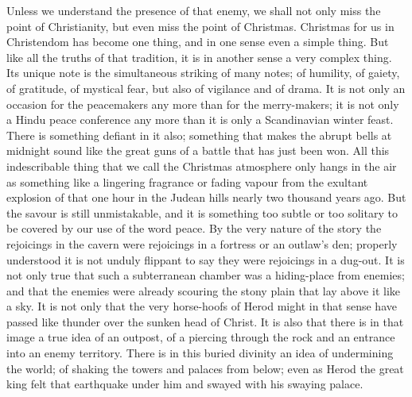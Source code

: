Unless we understand the presence of that enemy, we shall not only miss the point of Christianity, but even miss the point of Christmas. Christmas for us in Christendom has become one thing, and in one sense even a simple thing. But like all the truths of that tradition, it is in another sense a very complex thing. Its unique note is the simultaneous striking of many notes; of humility, of gaiety, of gratitude, of mystical fear, but also of vigilance and of drama. It is not only an occasion for the peacemakers any more than for the merry-makers; it is not only a Hindu peace conference any more than it is only a Scandinavian winter feast. There is something defiant in it also; something that makes the abrupt bells at midnight sound like the great guns of a battle that has just been won. All this indescribable thing that we call the Christmas atmosphere only hangs in the air as something like a lingering fragrance or fading vapour from the exultant explosion of that one hour in the Judean hills nearly two thousand years ago. But the savour is still unmistakable, and it is something too subtle or too solitary to be covered by our use of the word peace. By the very nature of the story the rejoicings in the cavern were rejoicings in a fortress or an outlaw's den; properly understood it is not unduly flippant to say they were rejoicings in a dug-out. It is not only true that such a subterranean chamber was a hiding-place from enemies; and that the enemies were already scouring the stony plain that lay above it like a sky. It is not only that the very horse-hoofs of Herod might in that sense have passed like thunder over the sunken head of Christ. It is also that there is in that image a true idea of an outpost, of a piercing through the rock and an entrance into an enemy territory. There is in this buried divinity an idea of undermining the world; of shaking the towers and palaces from below; even as Herod the great king felt that earthquake under him and swayed with his swaying palace.

